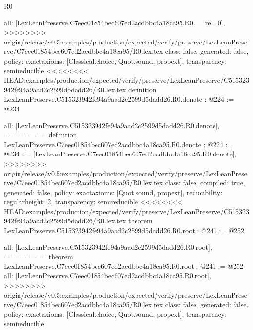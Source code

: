 \begin{lexlean}{R0}
\begin{coremodule}
{{{{  all: [LexLeanPreserve.C7eec01854bec607ed2acdbbc4a18ca95.R0.__rel_0],
>>>>>>>> origin/release/v0.5:examples/production/expected/verify/preserve/LexLeanPreserve/C7eec01854bec607ed2acdbbc4a18ca95/R0.lex.tex
  class: false,
  generated: false,
  policy: exact{axioms: [Classical.choice, Quot.sound, propext]},
  transparency: semireducible
}
<<<<<<<< HEAD:examples/production/expected/verify/preserve/LexLeanPreserve/C515323942fe94a9aad2c2599d5dadd26/R0.lex.tex
definition LexLeanPreserve.C515323942fe94a9aad2c2599d5dadd26.R0.denote : @224 := @234 {
  all: [LexLeanPreserve.C515323942fe94a9aad2c2599d5dadd26.R0.denote],
========
definition LexLeanPreserve.C7eec01854bec607ed2acdbbc4a18ca95.R0.denote : @224 := @234 {
  all: [LexLeanPreserve.C7eec01854bec607ed2acdbbc4a18ca95.R0.denote],
>>>>>>>> origin/release/v0.5:examples/production/expected/verify/preserve/LexLeanPreserve/C7eec01854bec607ed2acdbbc4a18ca95/R0.lex.tex
  class: false,
  compiled: true,
  generated: false,
  policy: exact{axioms: [Quot.sound, propext]},
  reducibility: regular{height: 2},
  transparency: semireducible
}
<<<<<<<< HEAD:examples/production/expected/verify/preserve/LexLeanPreserve/C515323942fe94a9aad2c2599d5dadd26/R0.lex.tex
theorem LexLeanPreserve.C515323942fe94a9aad2c2599d5dadd26.R0.root : @241 := @252 {
  all: [LexLeanPreserve.C515323942fe94a9aad2c2599d5dadd26.R0.root],
========
theorem LexLeanPreserve.C7eec01854bec607ed2acdbbc4a18ca95.R0.root : @241 := @252 {
  all: [LexLeanPreserve.C7eec01854bec607ed2acdbbc4a18ca95.R0.root],
>>>>>>>> origin/release/v0.5:examples/production/expected/verify/preserve/LexLeanPreserve/C7eec01854bec607ed2acdbbc4a18ca95/R0.lex.tex
  class: false,
  generated: false,
  policy: exact{axioms: [Classical.choice, Quot.sound, propext]},
  transparency: semireducible
}

}}}}}
\end{coremodule}
\end{lexlean}
